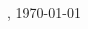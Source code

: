 \begin{titlepage}
\begin{addmargin}[0cm]{0cm}
        \vspace{0.2cm}

        \begin{flushright}
            \large{\myLocation, \today} \\
        \end{flushright}
    \end{addmargin}
\end{titlepage}

